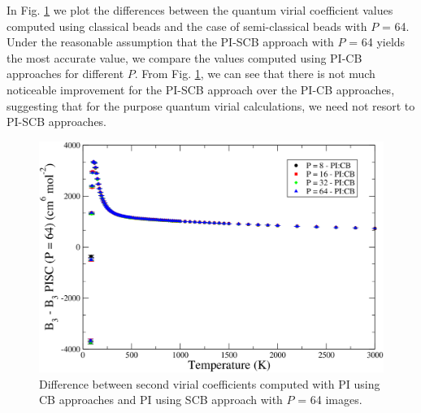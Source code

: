         In Fig. \ref{fig:B3AllDiffPICB} we plot the differences between the quantum virial coefficient values computed using classical beads and the case of semi-classical beads with $P$ = 64. Under the reasonable assumption that the PI-SCB approach with $P$ = 64 yields the most accurate value, we compare the values computed using PI-CB approaches for different $P$. From Fig. \ref{fig:B3AllDiffPICB}, we can see that there is not much noticeable improvement for the PI-SCB approach over the PI-CB approaches, suggesting that for the purpose quantum virial calculations, we need not resort to PI-SCB approaches.
        \begin{figure}[!htbp]
            \centering
            \includegraphics[scale=0.20,keepaspectratio]{Chapter-5/Figures/B3AllDiffPICB.png}
            \caption{Difference between second virial coefficients computed with PI using CB approaches and PI using SCB approach with $P$ = 64 images.}
            \label{fig:B3AllDiffPICB}
        \end{figure}
